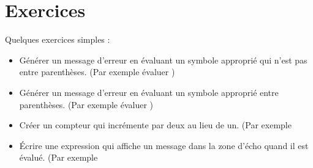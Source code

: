 \section{Exercices}

Quelques exercices simples :
\begin{itemize}
\item Générer un message d'erreur en évaluant un symbole approprié qui
  n'est pas entre parenthèses. (Par exemple évaluer \tm{+})
\item Générer un message d'erreur en évaluant un symbole approprié
  entre parenthèses. (Par exemple évaluer )
\item Créer un compteur qui incrémente par deux au lieu de un. (Par
  exemple 



\item \'Ecrire une expression qui affiche un message dans la zone
  d'écho quand il est évalué. (Par exemple 
\end{itemize}
